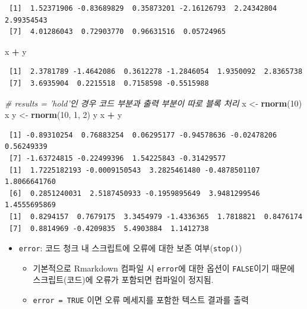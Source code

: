 \documentclass[
  11pt,
]{krantz}
\newenvironment{Shaded}{\begin{snugshade}}{\end{snugshade}}
\newcommand{\CommentTok}[1]{\textcolor[rgb]{0.37,0.37,0.37}{\textit{#1}}}
\newcommand{\DecValTok}[1]{\textcolor[rgb]{0.06,0.06,0.06}{#1}}
\newcommand{\KeywordTok}[1]{\textcolor[rgb]{0.27,0.27,0.27}{\textbf{#1}}}
\newcommand{\NormalTok}[1]{#1}
\newcommand{\OperatorTok}[1]{\textcolor[rgb]{0.43,0.43,0.43}{\textbf{#1}}}
\newcommand{\StringTok}[1]{\textcolor[rgb]{0.5,0.5,0.5}{#1}}
\providecommand{\tightlist}{%
  \setlength{\itemsep}{0pt}\setlength{\parskip}{0pt}}
\begin{document}
\begin{verbatim}
 [1]  1.52371906 -0.83689829  0.35873201 -2.16126793  2.24342804  2.99354543
 [7]  4.01286043  0.72903770  0.96631516  0.05724965
\end{verbatim}

\begin{Shaded}
\begin{Highlighting}[]
\NormalTok{x }\OperatorTok{+}\StringTok{ }\NormalTok{y}
\end{Highlighting}
\end{Shaded}

\begin{verbatim}
 [1]  2.3781789 -1.4642086  0.3612278 -1.2846054  1.9350092  2.8365738
 [7]  3.6935904  0.2215518  0.7158598 -0.5515988
\end{verbatim}

\normalsize

\footnotesize

\begin{Shaded}
\begin{Highlighting}[]
\CommentTok{# results = 'hold'인 경우 코드 부분과 출력 부분이 따로 블록 처리}
\NormalTok{x <-}\StringTok{ }\KeywordTok{rnorm}\NormalTok{(}\DecValTok{10}\NormalTok{)}
\NormalTok{x}
\NormalTok{y <-}\StringTok{ }\KeywordTok{rnorm}\NormalTok{(}\DecValTok{10}\NormalTok{, }\DecValTok{1}\NormalTok{, }\DecValTok{2}\NormalTok{)}
\NormalTok{y}
\NormalTok{x }\OperatorTok{+}\StringTok{ }\NormalTok{y}
\end{Highlighting}
\end{Shaded}

\begin{verbatim}
 [1] -0.89310254  0.76883254  0.06295177 -0.94578636 -0.02478206  0.56249339
 [7] -1.63724815 -0.22499396  1.54225843 -0.31429577
 [1]  1.7225182193 -0.0009150543  3.2825461480 -0.4878501107  1.8066641760
 [6]  0.2851240031  2.5187450933 -0.1959895649  3.9481299546  1.4555695869
 [1]  0.8294157  0.7679175  3.3454979 -1.4336365  1.7818821  0.8476174
 [7]  0.8814969 -0.4209835  5.4903884  1.1412738
\end{verbatim}

\normalsize

\begin{itemize}
\tightlist
\item
  \texttt{error}: 코드 청크 내 스크립트에 오류에 대한 보존 여부(\texttt{stop()})

  \begin{itemize}
  \tightlist
  \item
    기본적으로 Rmarkdown 컴파일 시 \texttt{error}에 대한 옵션이 \texttt{FALSE}이기 때문에 스크립트(코드)에 오류가 포함되면 컴파일이 정지됨.
  \item
    \texttt{error\ =\ TRUE} 이면 오류 메세지를 포함한 텍스트 결과를 출력
  \end{itemize}
\end{itemize}
\end{document}
